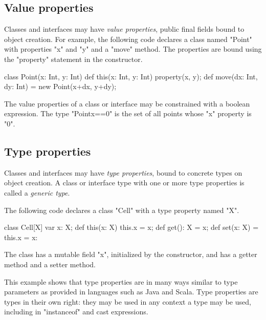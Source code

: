 \subsection{Value properties}


        Classes and interfaces may have {\em value properties},
        public final fields bound to object creation.  
%
        For example, the following code declares a class named
        \xcd"Point" with properties \xcd"x" and \xcd"y"
        and a \xcd"move" method.  The properties are bound
        using the \xcd"property" statement in the constructor.

\begin{xten}
class Point(x: Int, y: Int) {
  def this(x: Int, y: Int) { property(x, y); }
  def move(dx: Int, dy: Int) = new Point(x+dx, y+dy);
}
\end{xten}

        The value properties of a class or interface may be
        constrained with a boolean expression.  The type
        \xcd"Point{x==0}" is the set of all points whose \xcd"x"
        property is \xcd"0".


\subsection{Type properties}
\label{TypeProperties}


        Classes and interfaces may have {\em type properties}, bound
        to concrete types on object creation.
        A class or interface type
        with one or more type properties is called a {\em
        generic type}.

The following code declares a class \xcd"Cell" with a type
property named \xcd"X".
\begin{xten}
class Cell[X] {
    var x: X;
    def this(x: X) { this.x = x; }
    def get(): X = x;
    def set(x: X) = { this.x = x: }
}
\end{xten}
The class has a mutable field \xcd"x", initialized by the
constructor, and has a getter method and a setter method.

This example shows that type properties are in many ways similar to
type parameters as provided in languages such as Java and Scala.
Type properties are types in their own right:
they may be used in any context a type may be used,
including in \xcd"instanceof" and cast expressions.

